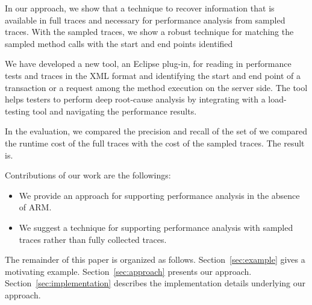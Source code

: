 In our approach, we show that a technique to recover information that is available in full traces and necessary for performance analysis from sampled traces. 
With the sampled traces, we show a robust technique for matching the sampled method calls with the start and end points identified

We have developed a new tool, an Eclipse plug-in, for reading in performance tests and traces in the XML format and identifying the start and end point of a transaction or a request among the method execution on the server side. The tool helps testers to perform deep root-cause analysis by integrating with a load-testing tool and navigating the performance results.

In the evaluation, we compared the precision and recall of the set of we compared the runtime cost of the full traces with the cost of the sampled traces. {The result is.}


Contributions of our work are the followings:
\begin{itemize}
\item We provide an approach for supporting performance analysis in the absence of ARM. \vspace*{-1ex}
\item We suggest a technique for supporting performance analysis with sampled traces rather than fully collected traces.\vspace*{-1ex}
\end{itemize}

The remainder of this paper is organized as follows.
Section~\ref{sec:example} gives a motivating example.
Section~\ref{sec:approach} presents our approach.
Section~\ref{sec:implementation} describes the implementation details underlying our approach.

